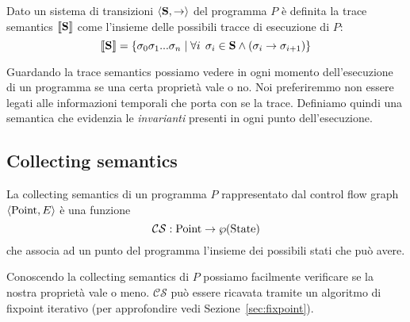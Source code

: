 \begin{definition}
Dato un sistema di transizioni $\langle \mathbf{S}, \to \rangle$ del programma $P$ è definita la trace semantics $\llbracket \mathbf{S} \rrbracket$ come l'insieme delle possibili tracce di esecuzione di $P$:
\[ \llbracket \mathbf{S} \rrbracket = \{ \sigma_0 \sigma_1 ... \sigma_n \mid \forall i \;\, \sigma_i \in \mathbf{S} \land (\sigma_i \to \sigma_{i+1}) \} \]
\end{definition}

Guardando la trace semantics possiamo vedere in ogni momento dell'esecuzione di un programma se una certa proprietà vale o no. Noi preferiremmo non essere legati alle informazioni temporali che porta con se la trace. Definiamo quindi una semantica che evidenzia le \emph{invarianti} presenti in ogni punto dell'esecuzione. 

\subsection{Collecting semantics}

\begin{definition}
La collecting semantics di un programma $P$ rappresentato dal control flow graph $\langle \mathrm{Point}, E \rangle$ è una funzione
\[ \mathcal{CS} : \mathrm{Point} \to \wp(\mathrm{State}) \]
che associa ad un punto del programma l'insieme dei possibili stati che può avere.
\end{definition}

Conoscendo la collecting semantics di $P$ possiamo facilmente verificare se la nostra proprietà vale o meno. $\mathcal{CS}$ può essere ricavata tramite un algoritmo di fixpoint iterativo (per approfondire vedi Sezione~\ref{sec:fixpoint}). 

